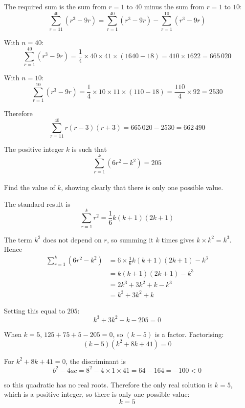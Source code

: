 \documentclass[leqno]{article}
\begin{document}
\begin{enumerate}[
  label=\textbf{\arabic*.},
  leftmargin=*,
  topsep=0pt,
  partopsep=0pt,
  parsep=0pt
]
\begin{djsSolution}
The required sum is the sum from \(r=1\) to \(40\) minus the sum from \(r=1\) to \(10\):
\[
\sum_{r=11}^{40}\left(r^3-9r\right)=\sum_{r=1}^{40}\left(r^3-9r\right)-\sum_{r=1}^{10}\left(r^3-9r\right)
\]

With \(n=40\):
\[
\sum_{r=1}^{40}\left(r^3-9r\right)=\frac14\times40\times41\times(1640-18)=410\times1622=665\,020
\]

With \(n=10\):
\[
\sum_{r=1}^{10}\left(r^3-9r\right)=\frac14\times10\times11\times(110-18)=\frac{110}{4}\times92=2530
\]

Therefore
\[
\sum_{r=11}^{40} r(r-3)(r+3)=665\,020-2530=662\,490
\]
\end{djsSolution}

\newpage

\questionitem

The positive integer $k$ is such that
\[\sum_{r=1}^{k} \left(6r^2 - k^2\right) = 205\] \\
Find the value of $k$, showing clearly that there is only one possible value.  \\

\vspace*{10pt}

\begin{djsSolution}
The standard result is
\[
\sum_{r=1}^{k} r^2=\frac16 k(k+1)(2k+1)
\]

The term \(k^2\) does not depend on \(r\), so summing it \(k\) times gives \(k\times k^2=k^3\). Hence
\begin{align*}
\sum_{r=1}^{k}\left(6r^2-k^2\right)&=6\times\frac16 k(k+1)(2k+1)-k^3\\
&=k(k+1)(2k+1)-k^3\\
&=2k^3+3k^2+k-k^3\\
&=k^3+3k^2+k
\end{align*}

Setting this equal to \(205\):
\[
k^3+3k^2+k-205=0
\]

When \(k=5\), \(125+75+5-205=0\), so \((k-5)\) is a factor. Factorising:
\[
(k-5)\left(k^2+8k+41\right)=0
\]

For \(k^2+8k+41=0\), the discriminant is
\[
b^2-4ac=8^2-4\times1\times41=64-164=-100<0
\]

so this quadratic has no real roots. Therefore the only real solution is \(k=5\), which is a positive integer, so there is only one possible value:
\[
k=5
\]
\end{djsSolution}


\end{enumerate}
\end{document}
